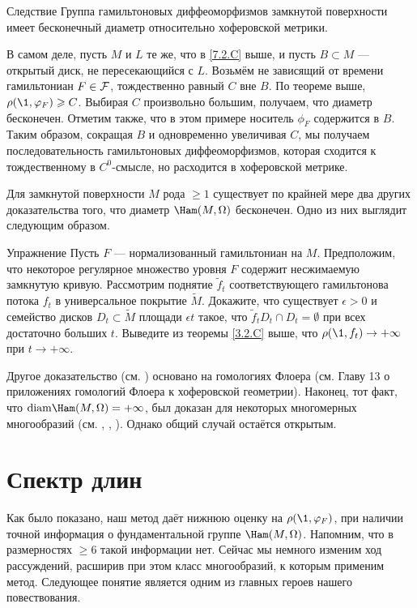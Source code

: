 \begin{thm}{Следствие}\label{7.2.D} Группа гамильтоновых диффеоморфизмов замкнутой поверхности имеет бесконечный диаметр относительно хоферовской метрики.
\end{thm}

В самом деле, пусть $M$ и $L$ те же, что в \ref{7.2.C} выше, и пусть $B \subset M$ --- открытый диск, не пересекающийся с $L$.
Возьмём не зависящий от времени гамильтониан $F \in \mathcal{F}$, тождественно равный $C$ вне $B$.
По теореме выше, $\rho (\1, \phi_F) \ge C$.
Выбирая $C$ произвольно большим, получаем, что диаметр бесконечен.
Отметим также, что в этом примере носитель $\phi_F$ содержится в $B$.
Таким образом, сокращая $B$ и одновременно увеличивая $C$, мы получаем последовательность гамильтоновых диффеоморфизмов, которая сходится к тождественному в $C^0$-смысле, но расходится в хоферовской метрике.

Для замкнутой поверхности $M$ рода $\ge 1$ существует по крайней мере два других доказательства того, что диаметр $\Ham (M, \Omega)$ бесконечен.
Одно из них выглядит следующим образом.

\begin{thm}[см. \cite{LM2}.]{Упражнение} \label{7.2.E}
Пусть $F$ --- нормализованный гамильтониан на $M$.
Предположим, что некоторое регулярное множество уровня $F$ содержит несжимаемую замкнутую кривую.
Рассмотрим поднятие $\tilde f_t$ соответствующего гамильтонова потока $f_t$ в универсальное покрытие $\tilde M$.
Докажите, что существует $\epsilon> 0$ и семейство дисков $D_t \subset \tilde M$ площади $\epsilon t$ такое, что $\tilde f_t D_t \cap D_t = \emptyset$ при всех достаточно больших $t$.
Выведите из теоремы \ref{3.2.C} выше, что $\rho (\1, f_t) \to + \infty$ при $t \to + \infty$.
\end{thm}

Другое доказательство (см. \cite{Sch3}) основано на гомологиях Флоера (см. Главу 13 о приложениях гомологий Флоера к хоферовской геометрии).
Наконец, тот факт, что $\diam \Ham (M, \Omega) = + \infty$, был доказан для некоторых многомерных многообразий (см. \cite{LM2}, \cite{Sch3}, \cite{P5}).
Однако общий случай остаётся открытым.

\section{Спектр длин} 

Как было показано, наш метод даёт нижнюю оценку на $\rho (\1, \phi_F)$, при наличии точной информация о фундаментальной группе $\Ham (M, \Omega)$.
Напомним, что в размерностях $\ge 6$ такой информации нет.
Сейчас мы немного изменим ход рассуждений, расширив при этом класс многообразий, к которым применим метод.
Следующее понятие является одним из главных героев нашего повествования.

